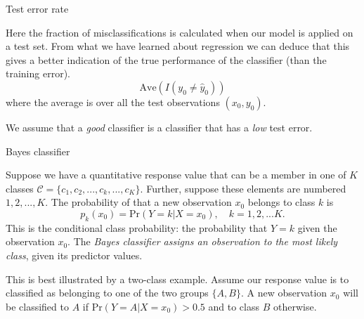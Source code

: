 \documentclass[ignorenonframetext,]{beamer}
\begin{document}
\begin{frame}

\begin{block}{Test error rate}

Here the fraction of misclassifications is calculated when our model is
applied on a test set. From what we have learned about regression we can
deduce that this gives a better indication of the true performance of
the classifier (than the training error).
\[\text{Ave}(I(y_0\neq \hat{y}_0))\] where the average is over all the
test observations \((x_0,y_0)\).

We assume that a \emph{good} classifier is a classifier that has a
\emph{low} test error.

\end{block}

\end{frame}

\begin{frame}

\begin{block}{Bayes classifier}

Suppose we have a quantitative response value that can be a member in
one of \(K\) classes \(\mathcal{C} = \{c_1, c_2, ..., c_k, ..., c_K\}\).
Further, suppose these elements are numbered \(1, 2, ..., K\). The
probability of that a new observation \(x_0\) belongs to class \(k\) is
\[p_k(x_0) = \text{Pr}(Y=k | X=x_0), \quad k = 1, 2, ... K.\] This is
the conditional class probability: the probability that \(Y=k\) given
the observation \(x_0\). The \emph{Bayes classifier assigns an
observation to the most likely class}, given its predictor values.

This is best illustrated by a two-class example. Assume our response
value is to classified as belonging to one of the two groups
\(\{A, B\}\). A new observation \(x_0\) will be classified to \(A\) if
\(\text{Pr}(Y=A | X=x_0) > 0.5\) and to class \(B\) otherwise.

\end{block}

\end{frame}
\end{document}
